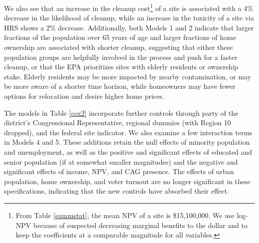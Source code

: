 \documentclass[12pt]{article}
\begin{document}
We also see that an increase in the cleanup cost\footnote{From Table \ref{summstat}, the mean NPV of a site is \$15,100,000. We use log-NPV because of suspected decreasing marginal benefits to the dollar and to keep the coefficients at a comparable magnitude for all variables.} of a site is associated with a 4\% decrease in the likelihood of cleanup, while an increase in the toxicity of a site via HRS shows a 2\% decrease.
Additionally, both Models 1 and 2 indicate that larger fractions of the population over 65 years of age and larger fractions of home ownership are associated with shorter cleanup, suggesting that either these population groups are helpfully involved in the process and push for a faster cleanup, or that the EPA prioritizes sites with elderly residents or ownership stake. Elderly residents may be more impacted by nearby contamination, or may be more aware of a shorter time horizon, while homeowners may have fewer options for relocation and desire higher home prices.

The models in Table \ref{cox2} incorporate further controls through party of the district's Congressional Representative, regional dummies (with Region 10 dropped), and the federal site indicator. We also examine a few interaction terms in Models 4 and 5. These additions retain the null effects of minority population and unemployment, as well as the positive and significant effects of educated and senior population (if at somewhat smaller magnitudes) and the negative and significant effects of income, NPV, and CAG presence. The effects of urban population, home ownership, and voter turnout are no longer significant in these specifications, indicating that the new controls have absorbed their effect. 
\end{document}
